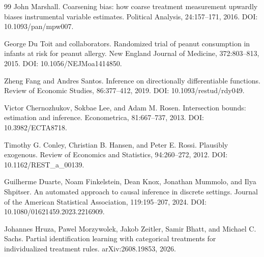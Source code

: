 \documentclass{article}
\begin{document}
\begin{thebibliography}{99}
   John Marshall. Coarsening bias: how coarse treatment measurement upwardly biases instrumental variable estimates. Political Analysis, 24:157--171, 2016. DOI: 10.1093/pan/mpw007.

   George Du Toit and collaborators. Randomized trial of peanut consumption in infants at risk for peanut allergy. New England Journal of Medicine, 372:803--813, 2015. DOI: 10.1056/NEJMoa1414850.

   Zheng Fang and Andres Santos. Inference on directionally differentiable functions. Review of Economic Studies, 86:377--412, 2019. DOI: 10.1093/restud/rdy049.

   Victor Chernozhukov, Sokbae Lee, and Adam M. Rosen. Intersection bounds: estimation and inference. Econometrica, 81:667--737, 2013. DOI: 10.3982/ECTA8718.

   Timothy G. Conley, Christian B. Hansen, and Peter E. Rossi. Plausibly exogenous. Review of Economics and Statistics, 94:260--272, 2012. DOI: 10.1162/REST\_a\_00139.

   Guilherme Duarte, Noam Finkelstein, Dean Knox, Jonathan Mummolo, and Ilya Shpitser. An automated approach to causal inference in discrete settings. Journal of the American Statistical Association, 119:195--207, 2024. DOI: 10.1080/01621459.2023.2216909.

   Johannes Hruza, Pawel Morzywolek, Jakob Zeitler, Samir Bhatt, and Michael C. Sachs. Partial identification learning with categorical treatments for individualized treatment rules. arXiv:2608.19853, 2026.

\end{thebibliography}
\end{document}
